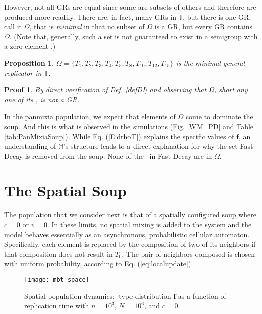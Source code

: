 \documentclass[pre,twocolumn,showpacs,superscriptaddress,preprintnumbers,floatfix]{revtex4}
\theoremstyle{plain}    \newtheorem{Lem}{Lemma}
\theoremstyle{plain}    \newtheorem*{ProLem}{Proof}
\theoremstyle{plain}    \newtheorem{Cor}{Corollary}
\theoremstyle{plain}    \newtheorem*{ProCor}{Proof}
\theoremstyle{plain}    \newtheorem{The}{Theorem}
\theoremstyle{plain}    \newtheorem*{ProThe}{Proof}
\theoremstyle{plain}    \newtheorem{Prop}{Proposition}
\theoremstyle{plain}    \newtheorem*{ProProp}{Proof}
\theoremstyle{plain}    \newtheorem*{Conj}{Conjecture}
\theoremstyle{plain}    \newtheorem*{Rem}{Remark}
\theoremstyle{plain}    \newtheorem{Def}{Definition}
\theoremstyle{plain}    \newtheorem*{Not}{Notation}
\newcommand{\T}{\mathbb{T}}
\newcommand{\M}{\mathbb{M}}
\newcommand{\PrEMType}{\mathbf{f}}
\begin{document}
However, not all GRs are equal since some are subsets of others and therefore
are produced more readily. There are, in fact, many GRs in $\T$, but there is
one GR, call it $\Omega$, that is \emph{minimal} in that no subset of $\Omega$
is a GR, but every GR contains $\Omega$. (Note that, generally, such a set is
not guaranteed to exist in a semigroup with a zero element \cite{Holc82a}.)

\begin{Prop}
$\Omega = \lbrace T_1, T_2, T_3, T_4, T_5, T_8, T_{10}, T_{12}, T_{15} \rbrace$
is the minimal general replicator in $\T$.
\end{Prop}

\begin{ProProp}
By direct verification of Def. \ref{defDI} and observing that $\Omega$, short
any one of its \eMs, is not a GR.
\end{ProProp}

In the panmixia population, we expect that elements of $\Omega$ come to
dominate the soup. And this is what is observed in the simulations
(Fig. \ref{WM_PD} and Table \ref{tab:PanMixiaSoup}). While Eq. (\ref{E:drhoT})
explains the specific values of $\PrEMType$, an understanding of $\M$'s
structure leads to a direct explanation for why the set Fast Decay is removed
from the soup: None of the \eMs\ in Fast Decay are in $\Omega$. 

\vspace{-0.2in}
\section{The Spatial Soup}
\vspace{-0.1in}

The population that we consider next is that of a spatially configured soup
where $c=0$ or $v=0$. In these limits, no spatial mixing is added to the system
and the model behaves essentially as an asynchronous, probabilistic cellular
automaton. Specifically, each element is replaced by the composition of two of
its neighbors if that composition does not result in $T_0$. The pair of
neighbors composed is chosen with uniform probability, according to
Eq. (\ref{eq:localupdate}).

\begin{figure}[hbt]
\texttt{[image: mbt\_space]}
\caption{Spatial population dynamics: \EM-type distribution $\PrEMType$ as a
  function of replication time with $n = 10^3$, $N = 10^6$, and $c=0$.
  }
\label{UM_PD}
\end{figure}
\end{document}
